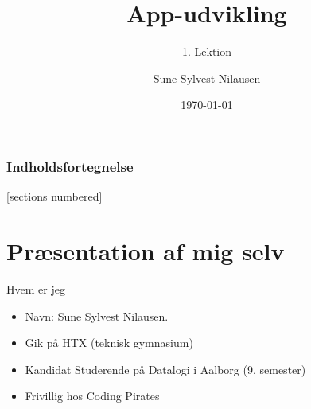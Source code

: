 \documentclass[10pt]{beamer}
\title{App-udvikling}
\subtitle{1. Lektion}
\date{\today}
\author{Sune Sylvest Nilausen}
\begin{document}

\maketitle

\begin{frame}
  \frametitle{Indholdsfortegnelse}
  [sections numbered]
  \tableofcontents[hideallsubsections]
\end{frame}

\section{Præsentation af mig selv}

\begin{frame}{Hvem er jeg}
	\begin{itemize}
		\item Navn: Sune Sylvest Nilausen.
		\item Gik på HTX (teknisk gymnasium)
		\item Kandidat Studerende på Datalogi i Aalborg (9. semester)
		\item Frivillig hos Coding Pirates
	\end{itemize}
	
\end{frame}
\end{document}

